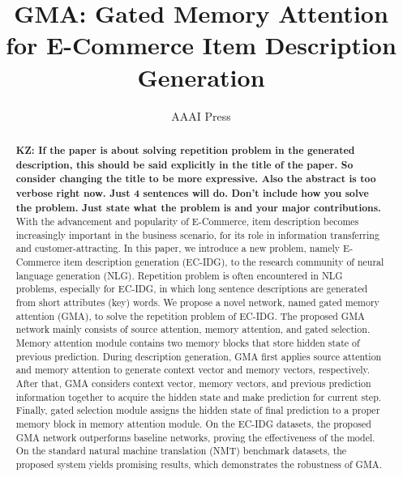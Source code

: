 \documentclass[letterpaper]{article} %
\newcommand{\KZ}[1]{{\bf \color{red} KZ: #1}}
\begin{document}

\title{GMA: Gated Memory Attention for E-Commerce Item Description Generation}
\author{AAAI Press
}
\maketitle
\begin{abstract}


\KZ{If the paper is about solving repetition problem in the generated
description, this should be said explicitly in the title of the paper.
So consider changing the title to be more expressive. Also the abstract is
too verbose right now. Just 4 sentences will do. Don't include how you solve
the problem. Just state what the problem is and your major contributions.}
With the advancement and popularity of E-Commerce, item description becomes increasingly important in the business scenario, 
for its role in information transferring and customer-attracting.
In this paper, we introduce a new problem, namely E-Commerce item description generation (EC-IDG), to the research community of neural language generation (NLG).
Repetition problem is often encountered in NLG problems, especially for EC-IDG, in which long sentence descriptions are generated from short attributes (key) words.
We propose a novel network, named gated memory attention (GMA), to solve the repetition problem of EC-IDG.
The proposed GMA network mainly consists of source attention, memory attention, and gated selection. 
Memory attention module contains two memory blocks that store hidden state of previous prediction.
During description generation, GMA first applies source attention and memory attention to generate context vector and memory vectors, respectively.
After that, GMA considers context vector, memory vectors, and previous prediction information together to acquire the hidden state and make prediction for current step.
Finally, gated selection module assigns the hidden state of final prediction to a proper memory block in memory attention module.
On the EC-IDG datasets, the proposed GMA network outperforms baseline networks, proving the effectiveness of the model. 
On the standard natural machine translation (NMT) benchmark datasets, the proposed system yields promising results, which demonstrates the robustness of GMA.
\end{abstract}
\end{document}
